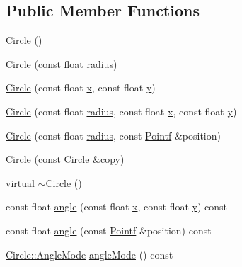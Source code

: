 \subsection*{Public Member Functions}
\begin{DoxyCompactItemize}
\item 
\hyperlink{classprism_1_1_circle_aff41793f64e90d15a4d89851b1a6b011}{Circle} ()
\item 
\hyperlink{classprism_1_1_circle_a4101ea55c7d90b63648742ef22460150}{Circle} (const float \hyperlink{classprism_1_1_circle_a75afa2c59f92909d6b6edcec338030fb}{radius})
\item 
\hyperlink{classprism_1_1_circle_aa6252ad78c2f76a1a4e15f93087bb2c6}{Circle} (const float \hyperlink{classprism_1_1_circle_ae1f729f8fa34605123628e67b230b6be}{x}, const float \hyperlink{classprism_1_1_circle_a6edc045d912b0d278bd0673af028290e}{y})
\item 
\hyperlink{classprism_1_1_circle_afb53c6e58fcd6cbc9effbe082c580892}{Circle} (const float \hyperlink{classprism_1_1_circle_a75afa2c59f92909d6b6edcec338030fb}{radius}, const float \hyperlink{classprism_1_1_circle_ae1f729f8fa34605123628e67b230b6be}{x}, const float \hyperlink{classprism_1_1_circle_a6edc045d912b0d278bd0673af028290e}{y})
\item 
\hyperlink{classprism_1_1_circle_af972289bbd2440b0436ad024634fb8d8}{Circle} (const float \hyperlink{classprism_1_1_circle_a75afa2c59f92909d6b6edcec338030fb}{radius}, const \hyperlink{classprism_1_1_pointf}{Pointf} \&position)
\item 
\hyperlink{classprism_1_1_circle_a95651a90ca498f4b811b8dee5c56dfba}{Circle} (const \hyperlink{classprism_1_1_circle}{Circle} \&\hyperlink{namespaceprism_ae776f4cd825f79e7af1cf6ee1d90a209}{copy})
\item 
virtual \hyperlink{classprism_1_1_circle_aff162a19ac60d0cefc5e5cc2ea397de7}{$\sim$\+Circle} ()
\item 
const float \hyperlink{classprism_1_1_circle_ad4b91cf13b593a67abf9782db3fec5d9}{angle} (const float \hyperlink{classprism_1_1_circle_ae1f729f8fa34605123628e67b230b6be}{x}, const float \hyperlink{classprism_1_1_circle_a6edc045d912b0d278bd0673af028290e}{y}) const 
\item 
const float \hyperlink{classprism_1_1_circle_aeee2c0f59b94feb4dd3535950157d614}{angle} (const \hyperlink{classprism_1_1_pointf}{Pointf} \&position) const 
\item 
\hyperlink{classprism_1_1_circle_a74c7c532b4eb120b9227b7fabeffe6ac}{Circle\+::\+Angle\+Mode} \hyperlink{classprism_1_1_circle_a0aa261d16ff55088e5695820fa95e09b}{angle\+Mode} () const 

\end{DoxyCompactItemize}
